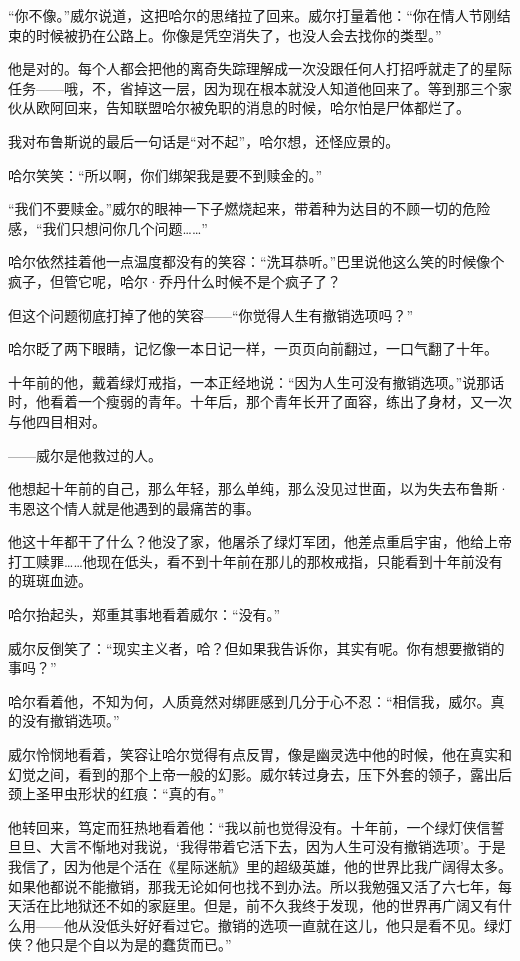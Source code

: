 \documentclass[../main]{subfiles}
\begin{document}
“你不像。”威尔说道，这把哈尔的思绪拉了回来。威尔打量着他：“你在情人节刚结束的时候被扔在公路上。你像是凭空消失了，也没人会去找你的类型。”

他是对的。每个人都会把他的离奇失踪理解成一次没跟任何人打招呼就走了的星际任务——哦，不，省掉这一层，因为现在根本就没人知道他回来了。等到那三个家伙从欧阿回来，告知联盟哈尔被免职的消息的时候，哈尔怕是尸体都烂了。

我对布鲁斯说的最后一句话是“对不起”，哈尔想，还怪应景的。

哈尔笑笑：“所以啊，你们绑架我是要不到赎金的。”

“我们不要赎金。”威尔的眼神一下子燃烧起来，带着种为达目的不顾一切的危险感，“我们只想问你几个问题\ldots\ldots”

哈尔依然挂着他一点温度都没有的笑容：“洗耳恭听。”巴里说他这么笑的时候像个疯子，但管它呢，哈尔·乔丹什么时候不是个疯子了？

但这个问题彻底打掉了他的笑容——“你觉得人生有撤销选项吗？”

哈尔眨了两下眼睛，记忆像一本日记一样，一页页向前翻过，一口气翻了十年。

十年前的他，戴着绿灯戒指，一本正经地说：“因为人生可没有撤销选项。”说那话时，他看着一个瘦弱的青年。十年后，那个青年长开了面容，练出了身材，又一次与他四目相对。

——威尔是他救过的人。

他想起十年前的自己，那么年轻，那么单纯，那么没见过世面，以为失去布鲁斯·韦恩这个情人就是他遇到的最痛苦的事。

他这十年都干了什么？他没了家，他屠杀了绿灯军团，他差点重启宇宙，他给上帝打工赎罪……他现在低头，看不到十年前在那儿的那枚戒指，只能看到十年前没有的斑斑血迹。

哈尔抬起头，郑重其事地看着威尔：“没有。”

威尔反倒笑了：“现实主义者，哈？但如果我告诉你，其实有呢。你有想要撤销的事吗？”

哈尔看着他，不知为何，人质竟然对绑匪感到几分于心不忍：“相信我，威尔。真的没有撤销选项。”

威尔怜悯地看着，笑容让哈尔觉得有点反胃，像是幽灵选中他的时候，他在真实和幻觉之间，看到的那个上帝一般的幻影。威尔转过身去，压下外套的领子，露出后颈上圣甲虫形状的红痕：“真的有。”

他转回来，笃定而狂热地看着他：“我以前也觉得没有。十年前，一个绿灯侠信誓旦旦、大言不惭地对我说，`我得带着它活下去，因为人生可没有撤销选项'。于是我信了，因为他是个活在《星际迷航》里的超级英雄，他的世界比我广阔得太多。如果他都说不能撤销，那我无论如何也找不到办法。所以我勉强又活了六七年，每天活在比地狱还不如的家庭里。但是，前不久我终于发现，他的世界再广阔又有什么用——他从没低头好好看过它。撤销的选项一直就在这儿，他只是看不见。绿灯侠？他只是个自以为是的蠢货而已。”
\end{document}
